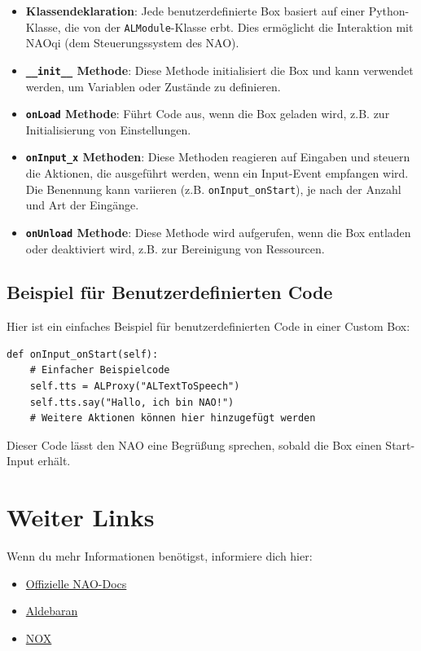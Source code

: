 \begin{itemize}
    \item \textbf{Klassendeklaration}: Jede benutzerdefinierte Box basiert auf einer Python-Klasse, die von der \texttt{ALModule}-Klasse erbt. Dies ermöglicht die Interaktion mit NAOqi (dem Steuerungssystem des NAO).
    \item \textbf{\texttt{\_\_init\_\_} Methode}: Diese Methode initialisiert die Box und kann verwendet werden, um Variablen oder Zustände zu definieren.
    \item \textbf{\texttt{onLoad} Methode}: Führt Code aus, wenn die Box geladen wird, z.B. zur Initialisierung von Einstellungen.
    \item \textbf{\texttt{onInput\_x} Methoden}: Diese Methoden reagieren auf Eingaben und steuern die Aktionen, die ausgeführt werden, wenn ein Input-Event empfangen wird. Die Benennung kann variieren (z.B. \texttt{onInput\_onStart}), je nach der Anzahl und Art der Eingänge.
    \item \textbf{\texttt{onUnload} Methode}: Diese Methode wird aufgerufen, wenn die Box entladen oder deaktiviert wird, z.B. zur Bereinigung von Ressourcen.
\end{itemize}

\subsection{Beispiel für Benutzerdefinierten Code}
Hier ist ein einfaches Beispiel für benutzerdefinierten Code in einer Custom Box:
\begin{verbatim}
def onInput_onStart(self):
    # Einfacher Beispielcode
    self.tts = ALProxy("ALTextToSpeech")
    self.tts.say("Hallo, ich bin NAO!")
    # Weitere Aktionen können hier hinzugefügt werden
\end{verbatim}
Dieser Code lässt den NAO eine Begrüßung sprechen, sobald die Box einen Start-Input erhält.

\section{Weiter Links}
Wenn du mehr Informationen benötigst, informiere dich hier: 
\begin{itemize}
    \item \href{http://doc.aldebaran.com/2-8/home_nao.html}{Offizielle NAO-Docs}
    \item \href{https://www.aldebaran.com/de/pepper-and-nao-robots-education}{Aldebaran}
    \item \href{https://noxtherobot.com/nao-the-robot/}{NOX}
\end{itemize}


